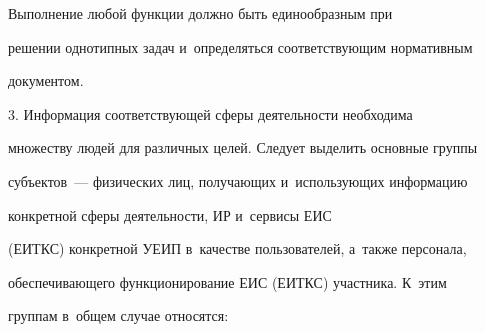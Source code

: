      

     Выполнение любой функции должно быть единообразным при 

решении однотипных задач и~определяться соответствующим нормативным 

документом.

     

     \smallskip

     

     3. Информация соответствующей сферы деятельности необходима 

множеству людей для различных целей. Следует выделить основные группы 

субъектов~--- физических лиц, получающих и~использующих информацию 

конкретной сферы деятельности, ИР и~сервисы ЕИС 

(ЕИТКС) конкретной УЕИП в~качестве пользователей, а~также персонала, 

обеспечивающего функционирование ЕИС (ЕИТКС) участника. К~этим 

группам в~общем случае относятся:

